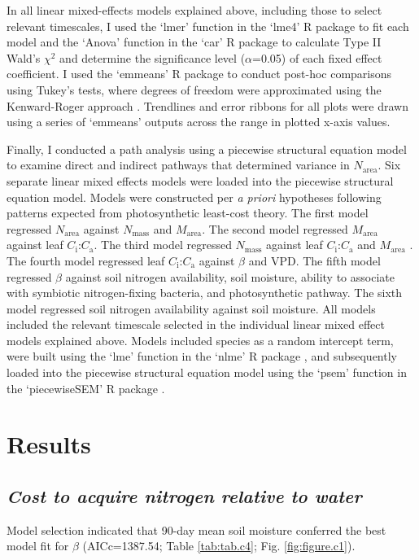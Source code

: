 In all linear mixed-effects models explained above, including those to select relevant timescales, I used the `lmer' function in the `lme4' R package  to fit each model and the `Anova' function in the `car' R package  to calculate Type II Wald's $\chi^2$ and determine the significance level ($\alpha$=0.05) of each fixed effect coefficient. I used the `emmeans' R package  to conduct post-hoc comparisons using Tukey's tests, where degrees of freedom were approximated using the Kenward-Roger approach . Trendlines and error ribbons for all plots were drawn using a series of `emmeans’ outputs across the range in plotted x-axis values.

Finally, I conducted a path analysis using a piecewise structural equation model to examine direct and indirect pathways that determined variance in $N_\mathrm{area}$. Six separate linear mixed effects models were loaded into the piecewise structural equation model. Models were constructed per \textit{a priori} hypotheses following patterns expected from photosynthetic least-cost theory. The first model regressed $N_\mathrm{area}$ against $N_\mathrm{mass}$ and $M_\mathrm{area}$. The second model regressed $M_\mathrm{area}$ against leaf $C_\mathrm{i}$:$C_\mathrm{a}$. The third model regressed $N_\mathrm{mass}$ against leaf $C_\mathrm{i}$:$C_\mathrm{a}$ and $M_\mathrm{area}$ . The fourth model regressed leaf $C_\mathrm{i}$:$C_\mathrm{a}$ against $\beta$ and VPD. The fifth model regressed $\beta$ against soil nitrogen availability, soil moisture, ability to associate with symbiotic nitrogen-fixing bacteria, and photosynthetic pathway. The sixth model regressed soil nitrogen availability against soil moisture. All models included the relevant timescale selected in the individual linear mixed effect models explained above. Models included species as a random intercept term, were built using the `lme’ function in the `nlme’ R package , and subsequently loaded into the piecewise structural equation model using the `psem’ function in the `piecewiseSEM’ R package .
\clearpage

\newpage
\section{Results}
\subsection{\textit{Cost to acquire nitrogen relative to water}}
\noindent Model selection indicated that 90-day mean soil moisture conferred the best model fit for $\beta$ (AICc=1387.54; Table \ref{tab:tab.c4}; Fig. \ref{fig:figure.c1}).

